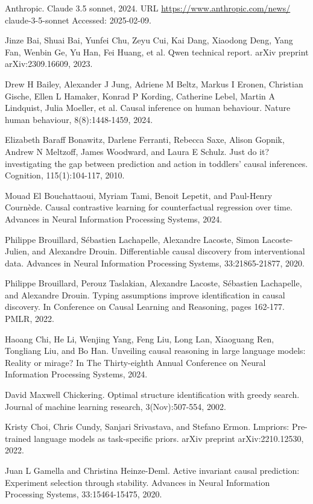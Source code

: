 \documentclass[10pt]{article}
\begin{document}
Anthropic. Claude 3.5 sonnet, 2024. URL \href{https://www.anthropic.com/news/}{https://www.anthropic.com/news/} claude-3-5-sonnet Accessed: 2025-02-09.

Jinze Bai, Shuai Bai, Yunfei Chu, Zeyu Cui, Kai Dang, Xiaodong Deng, Yang Fan, Wenbin Ge, Yu Han, Fei Huang, et al. Qwen technical report. arXiv preprint arXiv:2309.16609, 2023.

Drew H Bailey, Alexander J Jung, Adriene M Beltz, Markus I Eronen, Christian Gische, Ellen L Hamaker, Konrad P Kording, Catherine Lebel, Martin A Lindquist, Julia Moeller, et al. Causal inference on human behaviour. Nature human behaviour, 8(8):1448-1459, 2024.

Elizabeth Baraff Bonawitz, Darlene Ferranti, Rebecca Saxe, Alison Gopnik, Andrew N Meltzoff, James Woodward, and Laura E Schulz. Just do it? investigating the gap between prediction and action in toddlers' causal inferences. Cognition, 115(1):104-117, 2010.

Mouad El Bouchattaoui, Myriam Tami, Benoit Lepetit, and Paul-Henry Cournède. Causal contrastive learning for counterfactual regression over time. Advances in Neural Information Processing Systems, 2024.

Philippe Brouillard, Sébastien Lachapelle, Alexandre Lacoste, Simon Lacoste-Julien, and Alexandre Drouin. Differentiable causal discovery from interventional data. Advances in Neural Information Processing Systems, 33:21865-21877, 2020.

Philippe Brouillard, Perouz Taslakian, Alexandre Lacoste, Sébastien Lachapelle, and Alexandre Drouin. Typing assumptions improve identification in causal discovery. In Conference on Causal Learning and Reasoning, pages 162-177. PMLR, 2022.

Haoang Chi, He Li, Wenjing Yang, Feng Liu, Long Lan, Xiaoguang Ren, Tongliang Liu, and Bo Han. Unveiling causal reasoning in large language models: Reality or mirage? In The Thirty-eighth Annual Conference on Neural Information Processing Systems, 2024.

David Maxwell Chickering. Optimal structure identification with greedy search. Journal of machine learning research, 3(Nov):507-554, 2002.

Kristy Choi, Chris Cundy, Sanjari Srivastava, and Stefano Ermon. Lmpriors: Pre-trained language models as task-specific priors. arXiv preprint arXiv:2210.12530, 2022.

Juan L Gamella and Christina Heinze-Deml. Active invariant causal prediction: Experiment selection through stability. Advances in Neural Information Processing Systems, 33:15464-15475, 2020.
\end{document}
